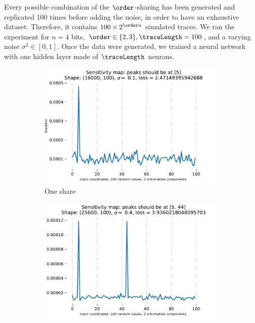 Every possible combination of the \(\order\)-sharing has been generated and replicated 100 times before adding the noise, in order to have an exhaustive dataset.
Therefore, it contains \(100 \times 2^{\order n}\) simulated traces. We ran the experiment for \(n = 4\) bits, \(\order \in \{2, 3\}, \traceLength = 100\), and a varying noise \(\sigma^2  \in [0, 1]\). 
Once the data were generated, we trained a neural network with one hidden layer made of \(\traceLength\) neurons.
\begin{figure}
	\centering
	\begin{subfigure}{0.49 \textwidth}
		\includegraphics[width=\textwidth]{figures/experience_1/1_shares_shape_16000_100_30_n_hidden_0_dot_1_sigma}
		\caption{One share}
		\label{fig:toy_example_1}
	\end{subfigure}
	\begin{subfigure}{0.49 \textwidth}
		\includegraphics[width=\textwidth]{figures/experience_1/2_shares_shape_25600_100_30_n_hidden_0_4_sigma}

\end{subfigure}
\end{figure}
